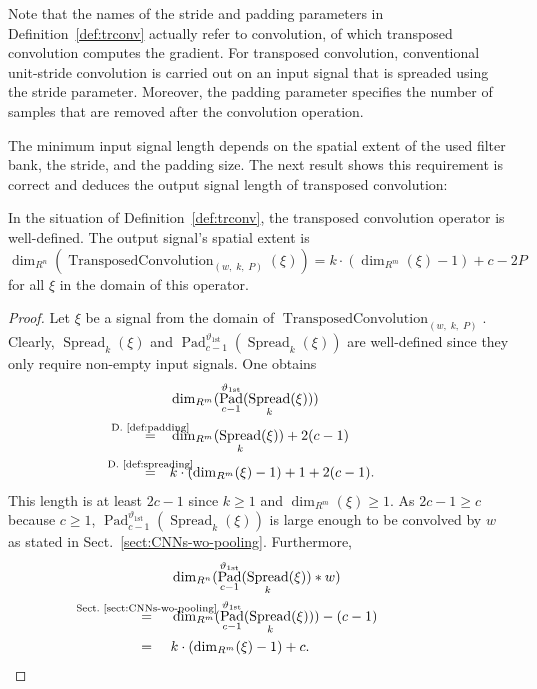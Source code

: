 \documentclass[journal]{IEEEtran}
\newcommand{\conv}{\ast}
\newcommand{\equsing}[1]{\overset{\mathclap{\text{#1}}}{=}}
\DeclareMathOperator{\Padding}{Pad}
\DeclareMathOperator{\Spreading}{Spread}
\DeclareMathOperator{\TransposedConvolution}{TransposedConvolution}
\newcommand{\Dirichlet}{1\text{st}}
\begin{document}
Note that the names of the stride and padding parameters in Definition~\ref{def:trconv} actually refer to convolution, of which transposed convolution computes the gradient.
For transposed convolution, conventional unit-stride convolution is carried out on an input signal that is spreaded using the stride parameter.
Moreover, the padding parameter specifies the number of samples that are removed after the convolution operation.

The minimum input signal length depends on the spatial extent of the used filter bank, the stride, and the padding size.
The next result shows this requirement is correct and deduces the output signal length of transposed convolution:
\begin{lemma}
\label{lem:trconv}
In the situation of Definition~\ref{def:trconv}, the transposed convolution operator is well-defined.
The output signal's spatial extent is $\dim_{R^n}(\TransposedConvolution_{(w,\; k,\; P)}(\xi)) = k\cdot(\dim_{R^m}(\xi) - 1) + c - 2P$ for all $\xi$ in the domain of this operator.
\end{lemma}\begin{proof}
Let $\xi$ be a signal from the domain of $\TransposedConvolution_{(w,\; k,\; P)}$.
Clearly, $\Spreading_k(\xi)$ and $\Padding_{c - 1}^{\vartheta_{\Dirichlet}}(\Spreading_k(\xi))$ are well-defined since they only require non-empty input signals.
One obtains
\begin{align*}
  & \dim_{R^m}( \Padding_{c - 1}^{\vartheta_{\Dirichlet}}( \Spreading_k(\xi)) )\\
  \equsing{D.~\ref{def:padding}}\ \ \ & \dim_{R^m}( \Spreading_k(\xi) ) + 2(c - 1)\\
  \equsing{D.~\ref{def:spreading}}\ \ \ & k\cdot(\dim_{R^m}(\xi) - 1) + 1 + 2(c - 1)\text{.}
\end{align*}
This length is at least $2c - 1$ since $k\geq 1$ and $\dim_{R^m}(\xi) \geq 1$.
As $2c - 1 \geq c$ because $c \geq 1$, $\Padding_{c - 1}^{\vartheta_{\Dirichlet}}(\Spreading_k(\xi))$ is large enough to be convolved by $w$ as stated in Sect.~\ref{sect:CNNs-wo-pooling}.
Furthermore,
\begin{align*}
  & \dim_{R^n}( \Padding_{c - 1}^{\vartheta_{\Dirichlet}}( \Spreading_k(\xi)) \conv w)\\
  \equsing{Sect.~\ref{sect:CNNs-wo-pooling}}\ \ \ \ & \dim_{R^m}( \Padding_{c - 1}^{\vartheta_{\Dirichlet}}( \Spreading_k(\xi)) ) - (c - 1)\\
  =\ \ \ \ & k\cdot(\dim_{R^m}(\xi) - 1) + c\text{.}
\end{align*}

\end{proof}
\end{document}
